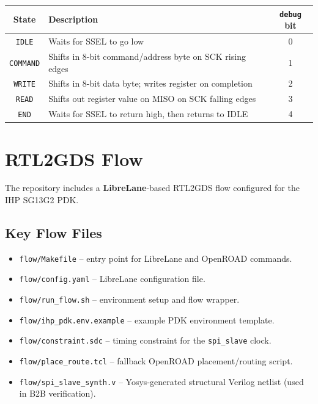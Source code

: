 \documentclass[11pt]{article}
\begin{document}
\begin{center}
\begin{tabular}{clc}
\toprule
State & Description & \texttt{debug} bit \\
\midrule
\texttt{IDLE}    & Waits for SSEL to go low & 0 \\
\texttt{COMMAND} & Shifts in 8-bit command/address byte on SCK rising edges & 1 \\
\texttt{WRITE}   & Shifts in 8-bit data byte; writes register on completion & 2 \\
\texttt{READ}    & Shifts out register value on MISO on SCK falling edges & 3 \\
\texttt{END}     & Waits for SSEL to return high, then returns to IDLE & 4 \\
\bottomrule
\end{tabular}
\end{center}

\section{RTL2GDS Flow}

The repository includes a \textbf{LibreLane}-based RTL2GDS flow configured for the IHP SG13G2 PDK.

\subsection{Key Flow Files}
\begin{itemize}
  \item \texttt{flow/Makefile} -- entry point for LibreLane and OpenROAD commands.
  \item \texttt{flow/config.yaml} -- LibreLane configuration file.
  \item \texttt{flow/run\_flow.sh} -- environment setup and flow wrapper.
  \item \texttt{flow/ihp\_pdk.env.example} -- example PDK environment template.
  \item \texttt{flow/constraint.sdc} -- timing constraint for the \texttt{spi\_slave} clock.
  \item \texttt{flow/place\_route.tcl} -- fallback OpenROAD placement/routing script.
  \item \texttt{flow/spi\_slave\_synth.v} -- Yosys-generated structural Verilog netlist (used in B2B verification).
\end{itemize}
\end{document}
